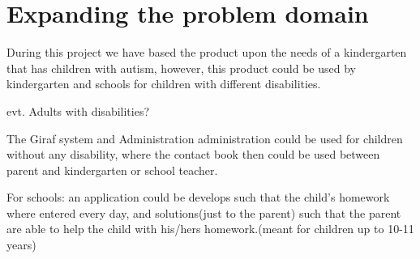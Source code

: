 \section{Expanding the problem domain}
During this project we have based the product upon the needs of a kindergarten that has children with autism, however, this product could be used by kindergarten and schools for children with different disabilities.

evt. Adults with disabilities?

The Giraf system and Administration administration could be used for children without any disability, where the contact book then could be used between parent and kindergarten or school teacher. 

For schools: an application could be develops such that the child's homework where entered every day, and solutions(just to the parent) such that the parent are able to help the child with his/hers homework.(meant for children up to 10-11 years)

    